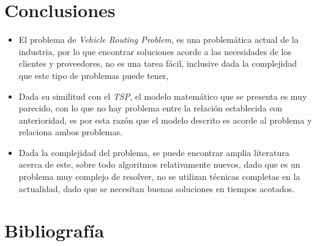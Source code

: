 \documentclass[letter, 10pt]{article}
\begin{document}
\section{Conclusiones}
\begin{itemize}
 \item El problema de \emph{Vehicle Routing Problem}, es una problem\'atica actual de la industria, por lo que encontrar soluciones acorde 
 a las necesidades de los clientes y proveedores, no es una tarea f\'acil, inclusive dada la complejidad que este tipo de problemas puede tener,
 \item Dada su similitud con el \emph{TSP}, el modelo matem\'atico que se presenta es muy parecido, con lo que no hay problema entre la 
 relaci\'on establecida con anterioridad, es por esta raz\'on que el modelo descrito es acorde al problema y relaciona ambos problemas.
 \item Dada la complejidad del problema, se puede encontrar amplia literatura acerca de este, sobre todo algoritmos relativamente nuevos, dado que
 es un problema muy complejo de resolver, no se utilizan t\'ecnicas completas en la actualidad, dado que se necesitan buenas soluciones en tiempos 
 acotados.
 \end{itemize}


\section{Bibliograf\'ia}


\end{document}
